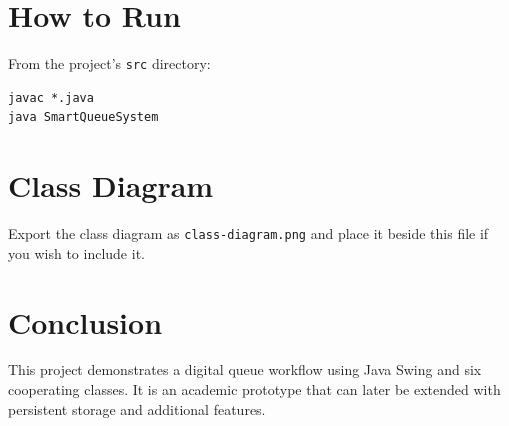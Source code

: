 \documentclass[12pt,a4paper]{article}
\begin{document}
\section{How to Run}
From the project's \texttt{src} directory:
\begin{lstlisting}
javac *.java
java SmartQueueSystem
\end{lstlisting}
\section{Class Diagram}
Export the class diagram as \texttt{class-diagram.png} and place it beside this file if you wish to include it.
\section{Conclusion}
This project demonstrates a digital queue workflow using Java Swing and six cooperating classes.
It is an academic prototype that can later be extended with persistent storage and additional features.
\end{document}
